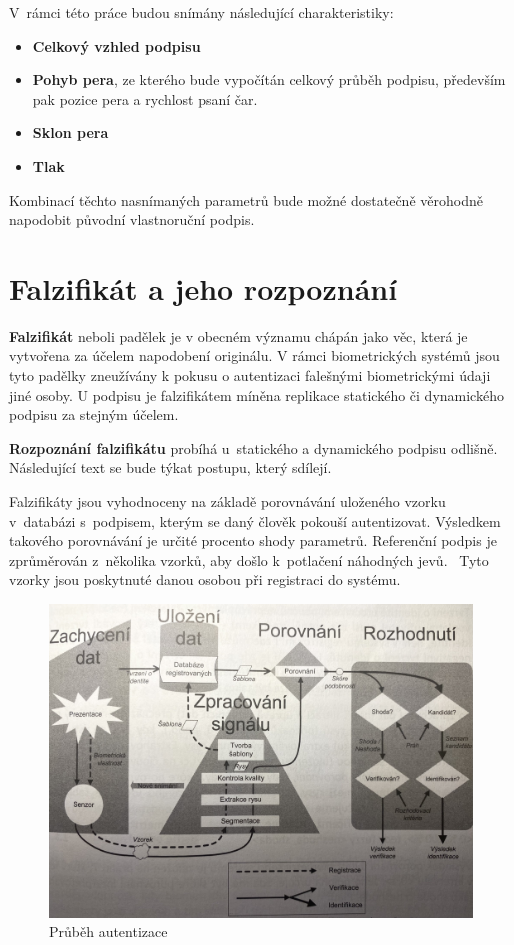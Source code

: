 \noindent
V~rámci této práce budou snímány následující charakteristiky:
\begin{itemize}
  \item \textbf{Celkový vzhled podpisu}
  \item \textbf{Pohyb pera}, ze kterého bude vypočítán celkový průběh podpisu, především pak pozice pera a rychlost psaní čar. 
  \item \textbf{Sklon pera} 
  \item \textbf{Tlak}
\end{itemize}
Kombinací těchto nasnímaných parametrů bude možné dostatečně věrohodně napodobit původní vlastnoruční podpis. 

\section{Falzifikát a jeho rozpoznání}
\textbf{Falzifikát} neboli padělek je v obecném významu chápán jako věc, která je vytvořena za účelem napodobení originálu. %
V rámci biometrických systémů jsou tyto padělky zneužívány k pokusu o autentizaci falešnými biometrickými údaji jiné osoby. %
U podpisu je falzifikátem míněna replikace statického či dynamického podpisu za stejným účelem.                             %
\newline

\noindent
\textbf{Rozpoznání falzifikátu} probíhá u~statického a dynamického podpisu odlišně. 
Následující text se bude týkat postupu, který sdílejí.

Falzifikáty jsou vyhodnoceny na základě porovnávání uloženého vzorku v~databázi s~podpisem, kterým se daný člověk pokouší autentizovat.
Výsledkem takového porovnávání je určité procento shody parametrů.
Referenční podpis je zprůměrován z~několika vzorků, aby došlo k~potlačení náhodných jevů.~\cite{VUT2009} %
Tyto vzorky jsou poskytnuté danou osobou při registraci do systému.

\begin{figure}[H]
  \centering
  \includegraphics[width=1\textwidth]{obrazky-figures/proces_autentizace.jpg}
  \caption{Průběh autentizace~\cite{DrahanskýMartin2011}}
  \label{fig:proces_autentizace}
\end{figure}

